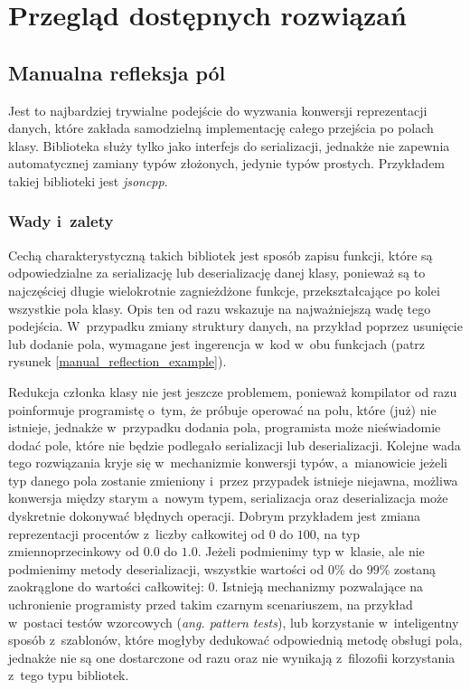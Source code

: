 \documentclass[12pt]{article}
\newcommand{\n}{\newline}
\newcommand{\nonpl}[1]{{\it #1}}
\newcommand{\ang}[1]{\nonpl{ang. #1}}
\begin{document}
	{
		\section{Przegląd dostępnych rozwiązań}

		{
			\subsection{Manualna refleksja pól}

			Jest to najbardziej trywialne podejście do wyzwania konwersji reprezentacji danych, które zakłada samodzielną implementację całego przejścia
			po polach klasy. Biblioteka służy tylko jako interfejs do serializacji, jednakże nie zapewnia automatycznej
			zamiany typów złożonych, jedynie typów prostych. Przykładem takiej biblioteki jest \nonpl{jsoncpp}\cite{jsoncpp_repo}.\n

			{
				\subsubsection{Wady i~zalety}

				Cechą charakterystyczną takich bibliotek jest sposób zapisu funkcji, które są odpowiedzialne za serializację lub deserializację
				danej klasy, ponieważ są to najczęściej długie wielokrotnie zagnieżdżone funkcje, przekształcające po kolei wszystkie pola klasy.
				Opis ten od razu wskazuje na najważniejszą wadę tego podejścia. W~przypadku zmiany struktury danych, na przykład poprzez usunięcie
				lub dodanie pola, wymagane jest ingerencja w~kod w~obu funkcjach (patrz rysunek \ref{manual_reflection_example}).\n

				Redukcja członka klasy nie jest jeszcze problemem, ponieważ kompilator od razu poinformuje programistę o~tym, że próbuje operować na polu,
				które (już) nie istnieje, jednakże w~przypadku dodania pola, programista może nieświadomie dodać pole, które nie będzie podlegało serializacji
				lub deserializacji. Kolejne wada tego rozwiązania kryje się w~mechanizmie konwersji typów, a~mianowicie jeżeli typ danego pola zostanie
				zmieniony i~przez przypadek istnieje niejawna, możliwa konwersja między starym a~nowym typem, serializacja oraz deserializacja może
				dyskretnie dokonywać błędnych operacji. Dobrym przykładem jest zmiana reprezentacji procentów z~liczby całkowitej od $0$ do $100$,
				na typ zmiennoprzecinkowy od $0.0$ do $1.0$. Jeżeli podmienimy typ w~klasie, ale nie podmienimy metody deserializacji, wszystkie wartości
				od $0\%$ do $99\%$ zostaną zaokrąglone do wartości całkowitej: $0$. Istnieją mechanizmy pozwalające na uchronienie programisty przed takim
				czarnym scenariuszem, na przykład w~postaci testów wzorcowych (\ang{pattern tests}), lub korzystanie w~inteligentny sposób z~szablonów,
				które mogłyby dedukować odpowiednią metodę obsługi pola, jednakże nie są one dostarczone od razu oraz nie wynikają z~filozofii
				korzystania z~tego typu bibliotek.\n

}}}
\end{document}
